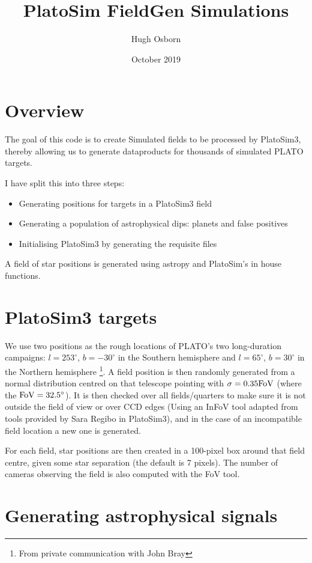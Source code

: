 \documentclass{article}
\title{PlatoSim FieldGen Simulations}
\author{Hugh Osborn}
\date{October 2019}
\begin{document}
\maketitle

\section{Overview}
The goal of this code is to create Simulated fields to be processed by PlatoSim3, thereby allowing us to generate dataproducts for thousands of simulated PLATO targets.

I have split this into three steps:
\begin{itemize}
    \item Generating positions for targets in a PlatoSim3 field 
    \item Generating a population of astrophysical dips: planets and false positives
    \item Initialising PlatoSim3 by generating the requisite files
\end{itemize}
A field of star positions is generated using astropy and PlatoSim's in house functions.

\section{PlatoSim3 targets}
We use two positions as the rough locations of PLATO's two long-duration campaigns: $l=253^\circ$, $b=-30^\circ$ in the Southern hemisphere and $l=65^\circ$, $b=30^\circ$ in the Northern hemisphere \footnote{From private communication with John Bray}.
A field position is then randomly generated from a normal distribution centred on that telescope pointing with $\sigma=0.35{\rm FoV}$ (where the ${\rm FoV}=32.5^\circ$).
It is then checked over all fields/quarters to make sure it is not outside the field of view or over CCD edges (Using an InFoV tool adapted from tools provided by Sara Regibo in PlatoSim3), and in the case of an incompatible field location a new one is generated.

For each field, star positions are then created in a 100-pixel box around that field centre, given some star separation (the default is 7 pixels).
The number of cameras observing the field is also computed with the FoV tool.

\section{Generating astrophysical signals}
\end{document}
